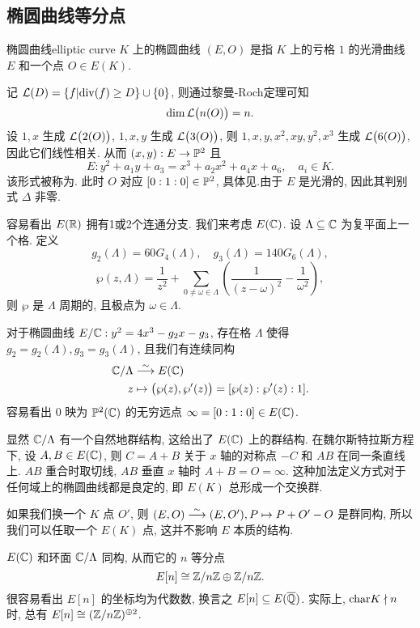 \subsection{椭圆曲线等分点}

\begin{definition}{椭圆曲线}{elliptic curve}
$K$ 上的椭圆曲线 $(E,O)$ 是指 $K$ 上的亏格 $1$ 的光滑曲线 $E$ 和一个点 $O\in E(K)$.
\end{definition}

记 ${\mathcal{L}}(D)=\left\{f|{\mathrm{div}}(f)\ge D\right\}\cup\left\{0\right\}$, 则通过黎曼-Roch定理可知   \[\dim {\mathcal{L}}\bigl(n(O)\bigr)=n.\] 设 $1,x$ 生成 ${\mathcal{L}}\bigl(2(O)\bigr)$, $1,x,y$ 生成 ${\mathcal{L}}\bigl(3(O)\bigr)$, 则 $1,x,y,x^2,xy,y^2,x^3$ 生成 ${\mathcal{L}}\bigl(6(O)\bigr)$, 因此它们线性相关. 从而 $(x,y):E\to {\mathbb{P}}^2$ 且
  \[E: y^2+a_1y+a_3=x^3+a_2x^2+a_4x+a_6,\quad a_i\in K.\]
该形式被称为. 此时 $O$ 对应 $[0:1:0]\in {\mathbb{P}}^2$, 具体见\cite[\S III.3]{Silverman2009}.由于 $E$ 是光滑的, 因此其判别式 $\Delta$ 非零.

容易看出 $E({\mathbb{R}})$ 拥有1或2个连通分支. 我们来考虑 $E({\mathbb{C}})$. 设 $\Lambda\subseteq {\mathbb{C}}$ 为复平面上一个格. 定义
  \[g_2(\Lambda)=60G_4(\Lambda),\quad g_3(\Lambda)=140 G_6(\Lambda),\]
  \[\wp(z,\Lambda)=\frac{1}{z^2}+\sum_{0\neq\omega\in\Lambda}\left(\frac{1}{(z-\omega)^2}-\frac{1}{\omega^2}\right),\]
则 $\wp$ 是 $\Lambda$ 周期的, 且极点为 $\omega\in\Lambda$.

\begin{theorem}{}{}
对于椭圆曲线 $E/{\mathbb{C}}:y^2=4x^3-g_2 x-g_3$, 存在格 $\Lambda$ 使得 $g_2=g_2(\Lambda),g_3=g_3(\Lambda)$, 且我们有连续同构
  \[\begin{split}
{\mathbb{C}}/\Lambda&\stackrel{\sim}{\longrightarrow} E({\mathbb{C}})\\
z&\mapsto \bigl(\wp(z),\wp'(z)\bigr)=[\wp(z):\wp'(z):1].
\end{split}\]
容易看出 $0$ 映为 ${\mathbb{P}}^2({\mathbb{C}})$ 的无穷远点 $\infty=[0:1:0]\in E({\mathbb{C}})$.
\end{theorem}
显然 ${\mathbb{C}}/\Lambda$ 有一个自然地群结构, 这给出了 $E({\mathbb{C}})$ 上的群结构. 在魏尔斯特拉斯方程下, 设 $A,B\in E({\mathbb{C}})$, 则 $C=A+B$ 关于 $x$ 轴的对称点 $-C$ 和 $AB$ 在同一条直线上. $AB$ 重合时取切线,  $AB$ 垂直 $x$ 轴时 $A+B=O=\infty$. 这种加法定义方式对于任何域上的椭圆曲线都是良定的, 即 $E(K)$ 总形成一个交换群.

如果我们换一个 $K$ 点 $O'$, 则 $(E,O)\stackrel{\sim}{\longrightarrow} (E,O'), P\mapsto P+O'-O$ 是群同构, 所以我们可以任取一个 $E(K)$ 点, 这并不影响 $E$ 本质的结构.

$E({\mathbb{C}})$ 和环面 ${\mathbb{C}}/\Lambda$ 同构, 从而它的 $n$ 等分点
  \[E[n]\cong {\mathbb{Z}}/n{\mathbb{Z}}\oplus{\mathbb{Z}}/n{\mathbb{Z}}.\]
很容易看出 $E[n]$ 的坐标均为代数数, 换言之 $E[n]\subseteq E(\overline{{\mathbb{Q}}})$. 实际上, ${\mathrm{char}} K\nmid n$ 时, 总有 $E[n]\cong({\mathbb{Z}}/n{\mathbb{Z}})^{\oplus2}$.

